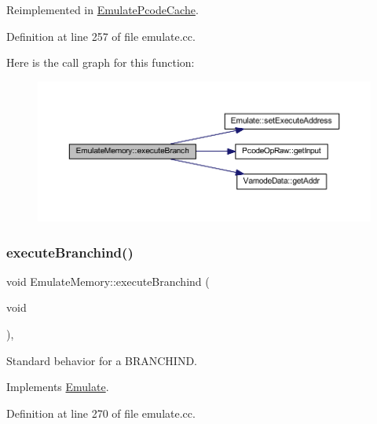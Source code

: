 Reimplemented in \mbox{\hyperlink{class_emulate_pcode_cache_a6108efef1c0291ca887228781e4c1238}{Emulate\+Pcode\+Cache}}.



Definition at line 257 of file emulate.\+cc.

Here is the call graph for this function\+:
\nopagebreak
\begin{figure}[H]
\begin{center}
\leavevmode
\includegraphics[width=350pt]{class_emulate_memory_ac69d1f93ffc1a86d3486af34bb520302_cgraph}
\end{center}
\end{figure}
\mbox{\label{class_emulate_memory_a64cee14cda2a10ed440fe171b8fdbcc0}} 
\subsubsection{\texorpdfstring{executeBranchind()}{executeBranchind()}}
{\footnotesize\ttfamily void Emulate\+Memory\+::execute\+Branchind (\begin{DoxyParamCaption}\item[{void}]{ }\end{DoxyParamCaption})\hspace{0.3cm}{\ttfamily [protected]}, {\ttfamily [virtual]}}



Standard behavior for a B\+R\+A\+N\+C\+H\+I\+ND. 



Implements \mbox{\hyperlink{class_emulate_a9b2a5e6e6328d22c6143a5ca7d3ce4e4}{Emulate}}.



Definition at line 270 of file emulate.\+cc.

